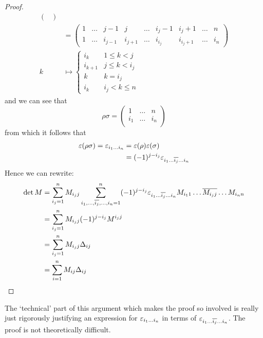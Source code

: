 \documentclass{../template/note}
\begin{document}
\begin{proof}
\begin{align*}
\begin{pmatrix}
            \end{pmatrix} \\
            &= \begin{pmatrix}
             1 & \dots & j-1 & j & \dots & i_j - 1 & i_j + 1 & \dots & n \\
             1 & \dots & i_{j-1} & i_{j+1} & \dots & i_{i_j} & i_{i_j+1} & \dots & i_n
            \end{pmatrix} \\
            k &\mapsto \begin{cases}
                i_k & 1 \leq k < j \\
                i_{k+1} & j \leq k < i_j \\
                k & k = i_j \\
                i_k & i_j < k \leq n
            \end{cases}
        \end{align*}
        and we can see that
        \[
            \rho \sigma = \begin{pmatrix}
             1 & \dots & n \\
             i_1 & \dots & i_n \\
            \end{pmatrix}
        \]
        from which it follows that
        \begin{align*}
            \varepsilon(\rho\sigma) = \varepsilon_{i_1 \dots i_n} &= \varepsilon(\rho)\varepsilon(\sigma) \\
            &= (-1)^{j-i_j}\varepsilon_{i_1 \dots \overline{i_j} \dots i_n}
        \end{align*}
        Hence we can rewrite:
        \begin{align*}
            \det M &= \sum_{i_j=1}^n M_{i_jj} \sum_{i_1, \dots, \overline{i_j}, \dots, i_n=1}^n (-1)^{j-i_j} \varepsilon_{i_1 \dots \overline{i_j} \dots i_n} M_{i_11} \dots \overline{M_{i_jj}} \dots M_{i_nn} \\
            &= \sum_{i_j=1}^n M_{i_jj}(-1)^{j-i_j}M^{i_jj} \\
            &= \sum_{i_j=1}^n M_{i_jj} \Delta_{ij} \\
            &= \sum_{i=1}^n M_{ij} \Delta_{ij}
        \end{align*}
    \end{proof}

    \begin{remark*}
        The `technical' part of this argument which makes the proof so involved is really just rigorously justifying an expression for \(\varepsilon_{i_1 \dots i_n}\) in terms of \(\varepsilon_{i_1 \dots \overline{i_j} \dots i_n}\). The proof is not theoretically difficult.
    \end{remark*}
    
\end{document}
